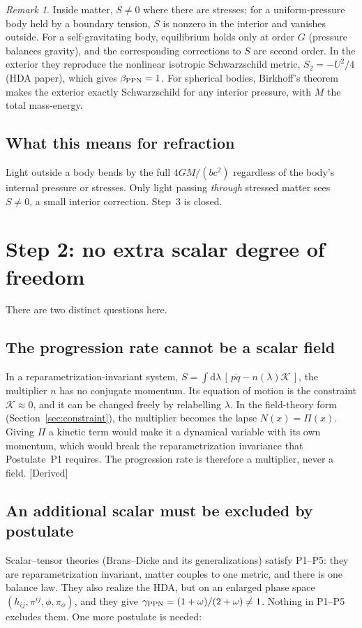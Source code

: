 \documentclass[11pt]{article}
\newcommand{\Pg}{\Pi}
\newcommand{\dd}{\mathrm{d}}
\newcommand{\st}[1]{\textsf{\small[#1]}}
\theoremstyle{plain}
\theoremstyle{definition}
\theoremstyle{remark}
\newtheorem{remark}{Remark}
\begin{document}
\begin{remark}
Inside matter, $S\neq0$ where there are stresses; for a uniform-pressure body held by a boundary tension, $S$ is nonzero in the interior and vanishes outside. For a self-gravitating body, equilibrium holds only at order $G$ (pressure balances gravity), and the corresponding corrections to $S$ are second order. In the exterior they reproduce the nonlinear isotropic Schwarzschild metric, $S_2=-U^2/4$ (HDA paper), which gives $\beta_{\rm PPN}=1$. For spherical bodies, Birkhoff's theorem makes the exterior exactly Schwarzschild for any interior pressure, with $M$ the total mass-energy.
\end{remark}

\subsection{What this means for refraction}
Light outside a body bends by the full $4GM/(bc^2)$ regardless of the body's internal pressure or stresses. Only light passing \emph{through} stressed matter sees $S\neq0$, a small interior correction. Step~3 is closed.

\section{Step 2: no extra scalar degree of freedom}
\label{sec:scalar}

There are two distinct questions here.

\subsection{The progression rate cannot be a scalar field}
In a reparametrization-invariant system, $S=\int\dd\lambda\,[\,p\dot q-n(\lambda)\mathcal K\,]$, the multiplier $n$ has no conjugate momentum. Its equation of motion is the constraint $\mathcal K\approx0$, and it can be changed freely by relabelling $\lambda$. In the field-theory form (Section~\ref{sec:constraint}), the multiplier becomes the lapse $N(x)=\Pg(x)$. Giving $\Pg$ a kinetic term would make it a dynamical variable with its own momentum, which would break the reparametrization invariance that Postulate~P1 requires. The progression rate is therefore a multiplier, never a field. \st{Derived}

\subsection{An additional scalar must be excluded by postulate}
Scalar--tensor theories (Brans--Dicke and its generalizations) satisfy P1--P5: they are reparametrization invariant, matter couples to one metric, and there is one balance law. They also realize the HDA, but on an enlarged phase space $(h_{ij},\pi^{ij},\phi,\pi_\phi)$, and they give $\gamma_{\rm PPN}=(1+\omega)/(2+\omega)\neq1$. Nothing in P1--P5 excludes them. One more postulate is needed:
\end{document}
